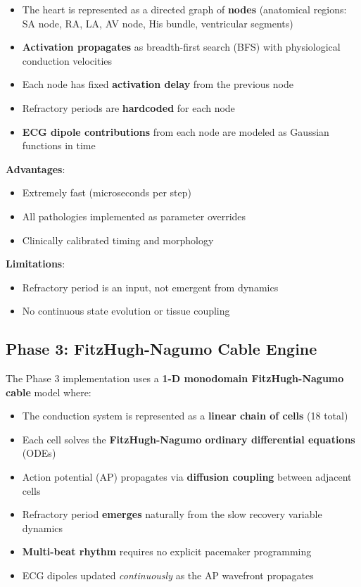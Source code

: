 \documentclass[12pt,a4paper,oneside]{book}
\begin{document}
\begin{itemize}
    \item The heart is represented as a directed graph of \textbf{nodes} (anatomical regions: SA node, RA, LA, AV node, His bundle, ventricular segments)
    \item \textbf{Activation propagates} as breadth-first search (BFS) with physiological conduction velocities
    \item Each node has fixed \textbf{activation delay} from the previous node
    \item Refractory periods are \textbf{hardcoded} for each node
    \item \textbf{ECG dipole contributions} from each node are modeled as Gaussian functions in time
\end{itemize}

\noindent \textbf{Advantages}:
\begin{itemize}
    \item Extremely fast (microseconds per step)
    \item All pathologies implemented as parameter overrides
    \item Clinically calibrated timing and morphology
\end{itemize}

\noindent \textbf{Limitations}:
\begin{itemize}
    \item Refractory period is an input, not emergent from dynamics
    \item No continuous state evolution or tissue coupling
\end{itemize}

\subsection{Phase 3: FitzHugh-Nagumo Cable Engine}

The Phase 3 implementation uses a \textbf{1-D monodomain FitzHugh-Nagumo cable} model where:

\begin{itemize}
    \item The conduction system is represented as a \textbf{linear chain of cells} (18 total)
    \item Each cell solves the \textbf{FitzHugh-Nagumo ordinary differential equations} (ODEs)
    \item Action potential (AP) propagates via \textbf{diffusion coupling} between adjacent cells
    \item Refractory period \textbf{emerges} naturally from the slow recovery variable dynamics
    \item \textbf{Multi-beat rhythm} requires no explicit pacemaker programming
    \item ECG dipoles updated \textit{continuously} as the AP wavefront propagates
\end{itemize}
\end{document}
